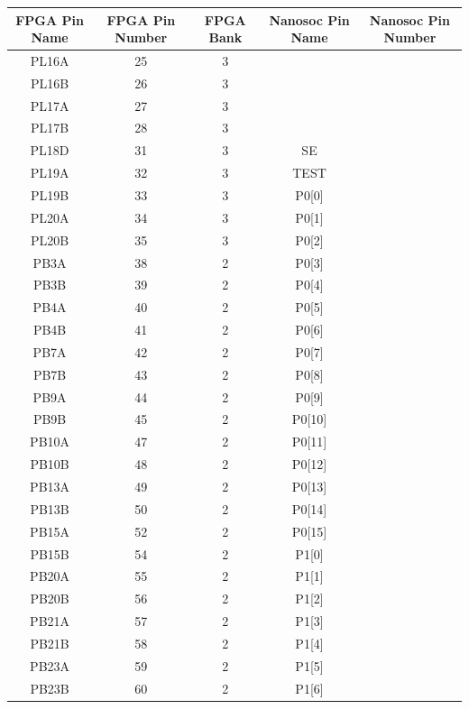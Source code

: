 \documentclass{article}
\begin{document}
\begin{table}[h!]
    \centering
    \begin{tabular}{ c c c c c}
    FPGA Pin Name & FPGA Pin Number & FPGA Bank &  Nanosoc Pin Name & Nanosoc Pin Number \\
    \hline
    PL16A   & 25    & 3    &  &   \\
    PL16B   & 26    & 3    &  &   \\
    PL17A   & 27    & 3    &  &   \\
    PL17B   & 28    & 3    &  &   \\
    PL18D   & 31    & 3    & SE     &   \\
    PL19A   & 32    & 3    & TEST   &   \\
    PL19B   & 33    & 3    & P0[0]  &   \\
    PL20A   & 34    & 3    & P0[1]  &   \\
    PL20B   & 35    & 3    & P0[2]  &   \\
    PB3A    & 38    & 2    & P0[3]  &   \\
    PB3B    & 39    & 2    & P0[4]  &   \\
    PB4A    & 40    & 2    & P0[5]  &   \\
    PB4B    & 41    & 2    & P0[6]  &   \\
    PB7A    & 42    & 2    & P0[7]  &   \\
    PB7B    & 43    & 2    & P0[8]  &   \\
    PB9A    & 44    & 2    & P0[9]  &   \\
    PB9B    & 45    & 2    & P0[10] &   \\
    PB10A   & 47    & 2    & P0[11] &   \\
    PB10B   & 48    & 2    & P0[12] &   \\
    PB13A   & 49    & 2    & P0[13] &   \\
    PB13B   & 50    & 2    & P0[14] &   \\
    PB15A   & 52    & 2    & P0[15] &   \\
    PB15B   & 54    & 2    & P1[0]  &   \\
    PB20A   & 55    & 2    & P1[1]  &   \\
    PB20B   & 56    & 2    & P1[2]  &   \\
    PB21A   & 57    & 2    & P1[3]  &   \\
    PB21B   & 58    & 2    & P1[4]  &   \\
    PB23A   & 59    & 2    & P1[5]  &   \\
    PB23B   & 60    & 2    & P1[6]  &   \\

\end{tabular}
\end{table}
\end{document}
